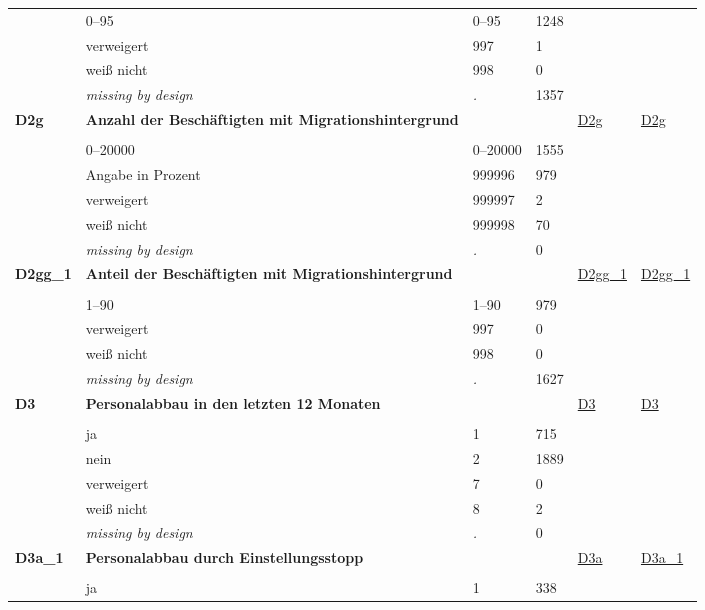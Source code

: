 \begin{longtable}{| L{2.45cm} | L{6cm} | C{1.5cm} | R{1cm} | C{2.25cm} | C{2.25cm} |}
   & 0--95 & 0--95 & 1248 &  &  \\ 
   & verweigert & 997 & 1 &  &  \\ 
   & weiß nicht & 998 & 0 &  &  \\ 
   & \textit{missing by design} & \textit{.} & 1357 &  &  \\ 
   \midrule
\textbf{D2g}\label{var:D2g} & \textbf{Anzahl der Beschäftigten mit Migrationshintergrund} &  &  & \hyperref[D2g]{D2g} & \hyperref[var:suf:D2g]{D2g} \\ 
   &  &  &  &  &  \\ 
   & 0--20000 & 0--20000 & 1555 &  &  \\ 
   & Angabe in Prozent & 999996 & 979 &  &  \\ 
   & verweigert & 999997 & 2 &  &  \\ 
   & weiß nicht & 999998 & 70 &  &  \\ 
   & \textit{missing by design} & \textit{.} & 0 &  &  \\ 
   \midrule
\textbf{D2gg\_1}\label{var:D2gg:1} & \textbf{Anteil der Beschäftigten mit Migrationshintergrund} &  &  & \hyperref[D2gg:1]{D2gg\_1} & \hyperref[var:suf:D2gg:1]{D2gg\_1} \\ 
   &  &  &  &  &  \\ 
   & 1--90 & 1--90 & 979 &  &  \\ 
   & verweigert & 997 & 0 &  &  \\ 
   & weiß nicht & 998 & 0 &  &  \\ 
   & \textit{missing by design} & \textit{.} & 1627 &  &  \\ 
   \midrule
\textbf{D3}\label{var:D3} & \textbf{Personalabbau in den letzten 12 Monaten} &  &  & \hyperref[D3]{D3} & \hyperref[var:suf:D3]{D3} \\ 
   &  &  &  &  &  \\ 
   & ja & 1 & 715 &  &  \\ 
   & nein & 2 & 1889 &  &  \\ 
   & verweigert & 7 & 0 &  &  \\ 
   & weiß nicht & 8 & 2 &  &  \\ 
   & \textit{missing by design} & \textit{.} & 0 &  &  \\ 
   \midrule
\textbf{D3a\_1}\label{var:D3a:1} & \textbf{Personalabbau durch Einstellungsstopp} &  &  & \hyperref[D3a]{D3a} & \hyperref[var:suf:D3a:1]{D3a\_1} \\ 
   &  &  &  &  &  \\ 
   & ja & 1 & 338 &  &  \\ 

\end{longtable}
